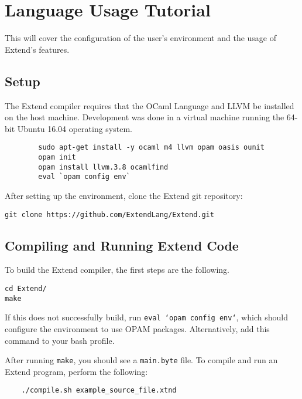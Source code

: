 \chapter{Language Usage Tutorial}

This will cover the configuration of the user's environment and the usage of Extend's features.

\section{Setup}
The Extend compiler requires that the OCaml Language and LLVM be installed on the host machine. Development was done in a virtual machine running the 64-bit Ubuntu 16.04 operating system.

	\begin{lstlisting}
		sudo apt-get install -y ocaml m4 llvm opam oasis ounit
		opam init
		opam install llvm.3.8 ocamlfind
		eval `opam config env`
	\end{lstlisting}

	\medskip \noindent After setting up the environment, clone the Extend git repository:

	\begin{lstlisting}
git clone https://github.com/ExtendLang/Extend.git
	\end{lstlisting}

\section{Compiling and Running Extend Code}
To build the Extend compiler, the first steps are the following.

	\begin{lstlisting}
cd Extend/
make
	\end{lstlisting}

	\medskip \noindent
	If this does not successfully build, run \texttt{eval `opam config env`}, which should configure the environment to use OPAM packages. Alternatively, add this command to your bash profile.

	 \medskip \noindent
	 After running \texttt{make}, you should see a \texttt{main.byte} file. To compile and run an Extend program, perform the following:

	\begin{lstlisting}
	./compile.sh example_source_file.xtnd
	\end{lstlisting}

